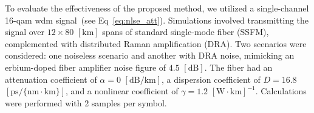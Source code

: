 To evaluate the effectiveness of the proposed method, we utilized a single-channel 16-\acrshort{qam} \gls{wdm} signal~(see Eq~\eqref{eq:nlse_att}). 
Simulations involved transmitting the signal over $12 \times 80$ $[\textrm{km}]$ spans of standard single-mode fiber (SSFM), complemented with distributed Raman amplification (DRA). Two scenarios were considered: one noiseless scenario and another with DRA noise, mimicking an erbium-doped fiber amplifier noise figure of $4.5$ $[\textrm{dB}]$. The fiber had an attenuation coefficient of $\alpha = 0$ $[\textrm{dB}/\textrm{km}]$, a dispersion coefficient of $D = 16.8$ $[\textrm{ps}/\{\textrm{nm} \cdot \textrm{km}\}]$, and a nonlinear coefficient of $\gamma = 1.2$ $[\textrm{W} \cdot \textrm{km}]^{-1}$. Calculations were performed with 2 samples per symbol.






